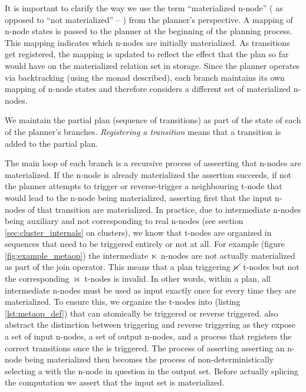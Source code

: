 It is important to clarify the way we use the term ``materialized n-node''
( as opposed to ``not materialized'' -- ) from the planner's
perspective. A mapping of n-node states is passed to the planner at the
beginning of the planning process. This mapping indicates which n-nodes
are initially materialized. As transitions get registered,
the mapping is updated to reflect the effect that the plan so far
would have on the materialized relation set in storage. Since the
planner operates via backtracking (using the  monad described),
each branch maintains its own mapping of n-node states and therefore
considers a different set of materialized n-nodes.

We maintain the partial plan (sequence of transitions) as part of the
state of each of the planner's branches. \emph{Registering a
  transition} means that a transition is added to the partial plan.

The main loop of each branch is a recursive process of asseerting that
n-nodes are materialized. If the n-node is already materialized the
assertion succeeds, if not the planner attempts to trigger or reverse-trigger
a neighbouring t-node that would lead to the n-node being
materialized, asserting first that the input n-nodes of that transition
are materialized. In practice, due to intermediate n-nodes being
auxiliary and not corresponding to real n-nodes (see section
\ref{sec:cluster_internals} on clusters), we know that t-nodes are
organized in sequences that need to be triggered entirely or not at
all. For example (figure \ref{fig:example_metaop}) the intermediate
\(\ltimes\) n-nodes are not actually materialized as part of the join
operator. This means that a plan triggering \(\cancel\ltimes\) t-nodes but
not the corresponding \(\Join\) t-nodes is invalid. In other words,
within a plan, all intermediate n-nodes must be used as input exactly
once for every time they are materialized. To ensure this, we organize
the t-nodes into  (listing \ref{lst:metaop_def}) that
can atomically be triggered or reverse triggered.  also
abstract the distinction between triggering and reverse triggering as
they expose a set of input n-nodes, a set of output n-nodes, and a process that
registers the correct transitions once the  is
triggered. The process of asserting asserting an n-node being
materialized then becomes the process of non-deterministically
selecting a  with the n-node in question in the output
set. Before actually splicing the  computation we assert
that the input set is materialized.


